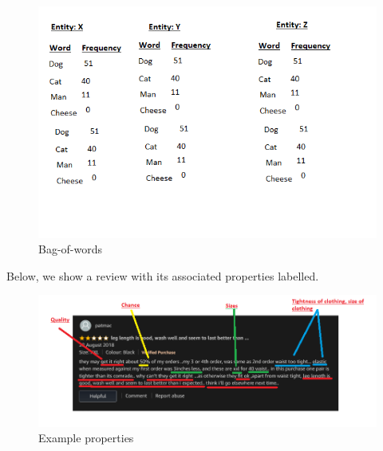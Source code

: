 \begin{figure}[t]
	\includegraphics[width=\textwidth]{images/bowbowbow.png}
	\centering
	\caption{Bag-of-words  }\label{Bag-of-words-example}
\end{figure}


 Below, we show a review with its associated properties labelled.

\begin{figure}[t]
	\includegraphics[width=\textwidth]{images/leg_length.png}
	\centering
	\caption{Example properties  }\label{IntroDecisionTree}
\end{figure}

